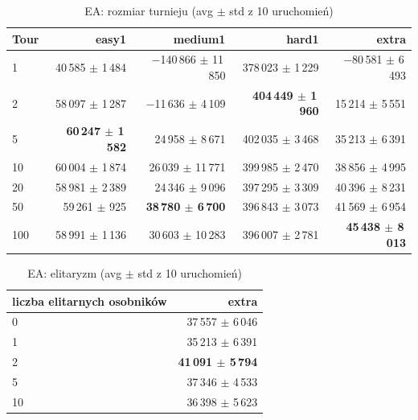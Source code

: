 \begin{table}[H]
  \centering
  \small
  \caption{EA: rozmiar turnieju (avg $\pm$ std z 10 uruchomień)}
  \label{tab:ea-tour}
  \begin{tabular}{lrrrr}
    \toprule
    Tour & easy1 & medium1 & hard1 & extra \\
    \midrule
    1 & 40\,585 $\pm$ 1\,484 & $-$140\,866 $\pm$ 11\,850 & 378\,023 $\pm$ 1\,229 & $-$80\,581 $\pm$ 6\,493 \\
    2 & 58\,097 $\pm$ 1\,287 & $-$11\,636 $\pm$ 4\,109 & \textbf{404\,449 $\pm$ 1\,960} & 15\,214 $\pm$ 5\,551 \\
    5 & \textbf{60\,247 $\pm$ 1\,582} & 24\,958 $\pm$ 8\,671 & 402\,035 $\pm$ 3\,468 & 35\,213 $\pm$ 6\,391 \\
    10 & 60\,004 $\pm$ 1\,874 & 26\,039 $\pm$ 11\,771 & 399\,985 $\pm$ 2\,470 & 38\,856 $\pm$ 4\,995 \\
    20 & 58\,981 $\pm$ 2\,389 & 24\,346 $\pm$ 9\,096 & 397\,295 $\pm$ 3\,309 & 40\,396 $\pm$ 8\,231 \\
    50 & 59\,261 $\pm$ 925 & \textbf{38\,780 $\pm$ 6\,700} & 396\,843 $\pm$ 3\,073 & 41\,569 $\pm$ 6\,954 \\
    100 & 58\,991 $\pm$ 1\,136 & 30\,603 $\pm$ 10\,283 & 396\,007 $\pm$ 2\,781 & \textbf{45\,438 $\pm$ 8\,013} \\
    \bottomrule
  \end{tabular}
\end{table}

\begin{table}[H]
  \centering
  \small
  \caption{EA: elitaryzm (avg $\pm$ std z 10 uruchomień)}
  \label{tab:ea-elite}
  \begin{tabular}{lr}
    \toprule
    liczba elitarnych osobników & extra \\
    \midrule
    0 & 37\,557 $\pm$ 6\,046 \\
    1 & 35\,213 $\pm$ 6\,391 \\
    2 & \textbf{41\,091 $\pm$ 5\,794} \\
    5 & 37\,346 $\pm$ 4\,533 \\
    10 & 36\,398 $\pm$ 5\,623 \\
    \bottomrule
  \end{tabular}
\end{table}

